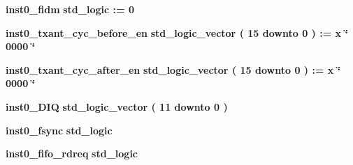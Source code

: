 \begin{DoxyCompactItemize}
\item 
{\bf inst0\+\_\+fidm} {\bfseries \textcolor{comment}{std\+\_\+logic}\textcolor{vhdlchar}{ }\textcolor{vhdlchar}{ }\textcolor{vhdlchar}{\+:}\textcolor{vhdlchar}{=}\textcolor{vhdlchar}{ }\textcolor{vhdlchar}{ }\textcolor{vhdlchar}{\textquotesingle{}}\textcolor{vhdlchar}{ } \textcolor{vhdldigit}{0} \textcolor{vhdlchar}{ }\textcolor{vhdlchar}{\textquotesingle{}}\textcolor{vhdlchar}{ }} 
\item 
{\bf inst0\+\_\+txant\+\_\+cyc\+\_\+before\+\_\+en} {\bfseries \textcolor{comment}{std\+\_\+logic\+\_\+vector}\textcolor{vhdlchar}{ }\textcolor{vhdlchar}{(}\textcolor{vhdlchar}{ }\textcolor{vhdlchar}{ } \textcolor{vhdldigit}{15} \textcolor{vhdlchar}{ }\textcolor{keywordflow}{downto}\textcolor{vhdlchar}{ }\textcolor{vhdlchar}{ } \textcolor{vhdldigit}{0} \textcolor{vhdlchar}{ }\textcolor{vhdlchar}{)}\textcolor{vhdlchar}{ }\textcolor{vhdlchar}{ }\textcolor{vhdlchar}{ }\textcolor{vhdlchar}{\+:}\textcolor{vhdlchar}{=}\textcolor{vhdlchar}{ }\textcolor{vhdlchar}{ }\textcolor{vhdlchar}{x}\textcolor{vhdlchar}{ }\textcolor{keyword}{\char`\"{} 0000 \char`\"{}}\textcolor{vhdlchar}{ }} 
\item 
{\bf inst0\+\_\+txant\+\_\+cyc\+\_\+after\+\_\+en} {\bfseries \textcolor{comment}{std\+\_\+logic\+\_\+vector}\textcolor{vhdlchar}{ }\textcolor{vhdlchar}{(}\textcolor{vhdlchar}{ }\textcolor{vhdlchar}{ } \textcolor{vhdldigit}{15} \textcolor{vhdlchar}{ }\textcolor{keywordflow}{downto}\textcolor{vhdlchar}{ }\textcolor{vhdlchar}{ } \textcolor{vhdldigit}{0} \textcolor{vhdlchar}{ }\textcolor{vhdlchar}{)}\textcolor{vhdlchar}{ }\textcolor{vhdlchar}{ }\textcolor{vhdlchar}{ }\textcolor{vhdlchar}{\+:}\textcolor{vhdlchar}{=}\textcolor{vhdlchar}{ }\textcolor{vhdlchar}{ }\textcolor{vhdlchar}{x}\textcolor{vhdlchar}{ }\textcolor{keyword}{\char`\"{} 0000 \char`\"{}}\textcolor{vhdlchar}{ }} 
\item 
{\bf inst0\+\_\+\+D\+IQ} {\bfseries \textcolor{comment}{std\+\_\+logic\+\_\+vector}\textcolor{vhdlchar}{ }\textcolor{vhdlchar}{(}\textcolor{vhdlchar}{ }\textcolor{vhdlchar}{ } \textcolor{vhdldigit}{11} \textcolor{vhdlchar}{ }\textcolor{keywordflow}{downto}\textcolor{vhdlchar}{ }\textcolor{vhdlchar}{ } \textcolor{vhdldigit}{0} \textcolor{vhdlchar}{ }\textcolor{vhdlchar}{)}\textcolor{vhdlchar}{ }} 
\item 
{\bf inst0\+\_\+fsync} {\bfseries \textcolor{comment}{std\+\_\+logic}\textcolor{vhdlchar}{ }} 
\item 
{\bf inst0\+\_\+fifo\+\_\+rdreq} {\bfseries \textcolor{comment}{std\+\_\+logic}\textcolor{vhdlchar}{ }} 

\end{DoxyCompactItemize}

